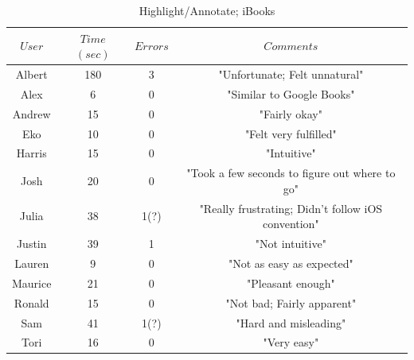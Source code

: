\documentclass[11pt, oneside]{article}
\begin{document}
\begin{table}[!hbt]
\begin{center}
\caption{Highlight/Annotate; iBooks}
\label{tab:task3learnKindle}
\begin{tabular}{|c|c|c|c|}
\hline
$User$ & $Time$ $(sec)$ & $Errors$ & $Comments$\\
\hline
Albert & 180 & 3 & "Unfortunate; Felt unnatural"\\
\hline
Alex & 6 & 0 & "Similar to Google Books"\\
\hline
Andrew & 15 & 0 & "Fairly okay"\\
\hline
Eko & 10 & 0 & "Felt very fulfilled"\\
\hline
Harris & 15 & 0 & "Intuitive"\\
\hline
Josh & 20 & 0 & "Took a few seconds to figure out where to go"\\
\hline
Julia & 38 & 1(?) & "Really frustrating; Didn't follow iOS convention"\\
\hline
Justin & 39 & 1 & "Not intuitive"\\
\hline
Lauren & 9 & 0 & "Not as easy as expected"\\
\hline
Maurice & 21 & 0 & "Pleasant enough"\\
\hline
Ronald & 15 & 0 & "Not bad; Fairly apparent"\\
\hline
Sam & 41 & 1(?) & "Hard and misleading"\\%
\hline
Tori & 16 & 0 & "Very easy"\\
\hline
\end{tabular}
\end{center}
\end{table}
\end{document}
